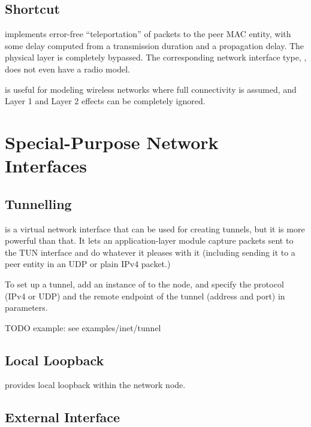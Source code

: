 \subsection{Shortcut}
\label{sec:interfaces:shortcut}

 implements error-free ``teleportation'' of packets
to the peer MAC entity, with some delay computed from a transmission
duration and a propagation delay. The physical layer is completely bypassed.
The corresponding network interface type, ,
does not even have a radio model.

 is useful for modeling wireless networks
where full connectivity is assumed, and Layer 1 and Layer 2 effects
can be completely ignored.

\section{Special-Purpose Network Interfaces}
\label{sec:interfaces:special-purpose-network-interfaces}


\subsection{Tunnelling}
\label{sec:interfaces:tunnelling}

 is a virtual network interface that can be used
for creating tunnels, but it is more powerful than that.
It lets an application-layer module capture packets sent to
the TUN interface and do whatever it pleases with it (including
sending it to a peer entity in an UDP or plain IPv4 packet.)

To set up a tunnel, add an instance of  to
the node, and specify the protocol (IPv4 or UDP) and the remote
endpoint of the tunnel (address and port) in parameters.

TODO example: see examples/inet/tunnel

\subsection{Local Loopback}
\label{sec:interfaces:local-loopback}

 provides local loopback within the network node.

\subsection{External Interface}
\label{sec:interfaces:external-interface}

